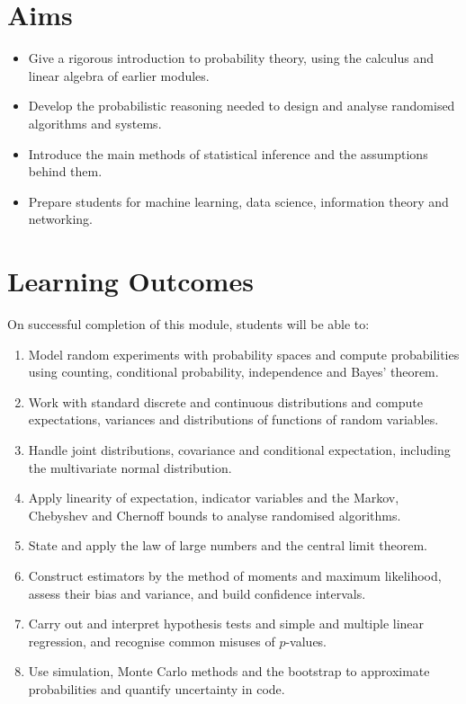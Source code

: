 \documentclass[11pt,a4paper]{article}
\begin{document}
\section{Aims}
\begin{itemize}
  \item Give a rigorous introduction to probability theory, using the calculus and linear algebra of earlier modules.
  \item Develop the probabilistic reasoning needed to design and analyse randomised algorithms and systems.
  \item Introduce the main methods of statistical inference and the assumptions behind them.
  \item Prepare students for machine learning, data science, information theory and networking.
\end{itemize}

\section{Learning Outcomes}
On successful completion of this module, students will be able to:
\begin{enumerate}[label=LO\arabic*.]
  \item Model random experiments with probability spaces and compute probabilities using counting, conditional probability, independence and Bayes' theorem.
  \item Work with standard discrete and continuous distributions and compute expectations, variances and distributions of functions of random variables.
  \item Handle joint distributions, covariance and conditional expectation, including the multivariate normal distribution.
  \item Apply linearity of expectation, indicator variables and the Markov, Chebyshev and Chernoff bounds to analyse randomised algorithms.
  \item State and apply the law of large numbers and the central limit theorem.
  \item Construct estimators by the method of moments and maximum likelihood, assess their bias and variance, and build confidence intervals.
  \item Carry out and interpret hypothesis tests and simple and multiple linear regression, and recognise common misuses of $p$-values.
  \item Use simulation, Monte Carlo methods and the bootstrap to approximate probabilities and quantify uncertainty in code.
\end{enumerate}
\end{document}
